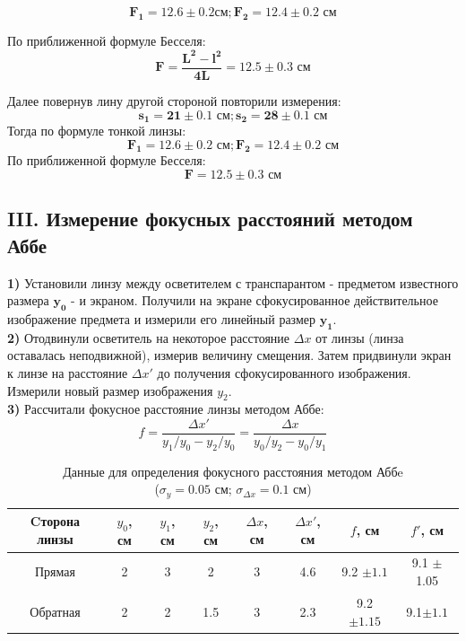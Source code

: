 $$\bm{F_1 = 12.6\pm 0.2 \textbf{см}; F_2 = 12.4\pm0.2 \textbf{ см}}$$

По приближенной формуле Бесселя:
\begin{equation}
    \bm{F = \frac{L^2 - l^2}{4L} = 12.5 \pm 0.3} \textbf{ см}
\end{equation}

Далее повернув лину другой стороной повторили измерения:
$$\bm{s_1 = 21 \pm 0.1 \textbf{ см}; s_2 = 28 \pm 0.1 \textbf{ см}} $$
Тогда по формуле тонкой линзы:
$$\bm{F_1 = 12.6 \pm 0.2 \textbf{ см}; F_2 = 12.4 \pm 0.2 \textbf{ см}} $$
По приближенной формуле Бесселя:
$$\bm{F = 12.5 \pm 0.3 \textbf{ см}}$$

\subsection*{III. Измерение фокусных расстояний методом Аббе}
\textbf{1)} Установили линзу между осветителем с транспарантом - предметом известного размера $\bm{y_0}$ - и экраном. Получили на экране сфокусированное действительное изображение предмета и измерили его линейный размер $\bm{y_1}$.\\ 

\textbf{2)} Отодвинули осветитель на некоторое расстояние ${\Delta x}$ от линзы (линза оставалась неподвижной), измерив величину смещения. Затем придвинули экран к линзе на расстояние ${\Delta x'}$ до получения сфокусированного изображения. Измерили новый размер изображения ${y_2}$. \\

\textbf{3)} Рассчитали фокусное расстояние линзы методом Аббе:
\begin{equation}
    f = \frac{\Delta x'}{y_1 / y_0 - y_2 / y_0} = \frac{\Delta x}{y_0 / y_2 - y_0 / y_1}
\end{equation}

\begin{table}[h!]
    \centering
    \begin{tabular}{|c|c|c|c|c|c|c|c|}
        \hline
        Cторона линзы & $y_0$, см & $y_1$, см & $y_2$, см & $\Delta x$, см & $\Delta x'$, см & $f$, см & $f'$, см \\\hline
        Прямая   & 2 & 3 & 2   & 3 & 4.6 & 9.2 $\pm 1.1$ & 9.1 $\pm$ 1.05\\\hline
        Обратная & 2 & 2 & 1.5 & 3 & 2.3 & 9.2 $\pm 1.15$ & 9.1$\pm 1.1$ \\\hline
    \end{tabular}
    \caption{Данные для определения фокусного расстояния методом Аббe\\($\sigma_y = 0.05$ см; $\sigma_{\Delta{x}} = 0.1$ см)}
\end{table}



